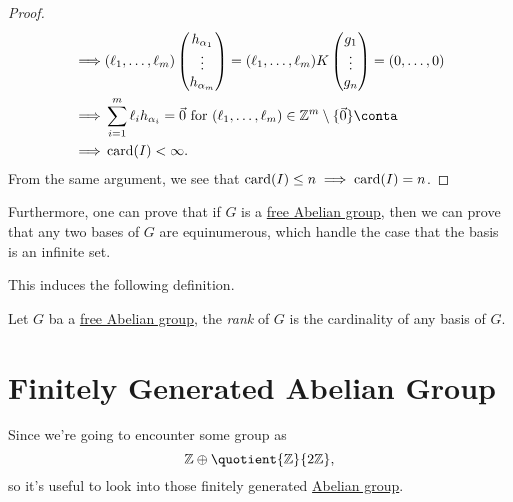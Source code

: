 \begin{proof}
\[\begin{split}
			\implies & (\ell _1, \dots , \ell _{m}  )\begin{pmatrix}
				                                         h_{\alpha _1} \\
				                                         \vdots        \\
				                                         h_{\alpha _m} \\
			                                         \end{pmatrix} = (\ell _1, \dots , \ell _m )K \begin{pmatrix}
				                                                                                      g_1    \\
				                                                                                      \vdots \\
				                                                                                      g_n    \\
			                                                                                      \end{pmatrix} = (0, \dots , 0)                                     \\
			\implies & \sum\limits_{i=1}^{m} \ell _{i} h_{\alpha _{i} }= \vec{0} \text{ for \((\ell_1, \dots, \ell_m)\in \mathbb{Z}^m\setminus \{\vec{0}\}\)} \conta \\
			\implies & \card (I) < \infty.
		\end{split}
	\]
	From the same argument, we see that \(\operatorname{card} (I) \leq n\implies \operatorname{card} (I) = n\).
\end{proof}

\begin{remark}
	Furthermore, one can prove that if \(G\) is a \hyperref[def:free-Abelian-group]{free Abelian group}, then we can prove that any two bases of \(G\) are equinumerous, which
	handle the case that the basis is an infinite set.
\end{remark}
This induces the following definition.

\begin{definition}[Rank]\label{def:rank}
	Let \(G\) ba a \hyperref[def:free-Abelian-group]{free Abelian group}, the \emph{rank} of \(G\) is the cardinality of any basis of \(G\).
\end{definition}

\section{Finitely Generated Abelian Group}\label{apx:ssc:finitely-generated-Abelian-group}
Since we're going to encounter some group as
\[
	\mathbb{Z} \oplus \quotient{\mathbb{Z}}{2\mathbb{Z} },
\]
so it's useful to look into those finitely generated \hyperref[def:Abelian-group]{Abelian group}.

